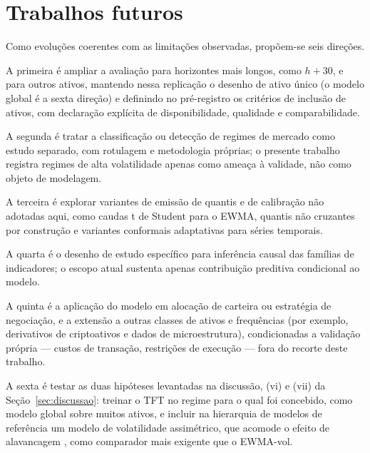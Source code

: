 \section{Trabalhos futuros}
Como evoluções coerentes com as limitações observadas, propõem-se seis direções.

A primeira é ampliar a avaliação para horizontes mais longos, como \(h+30\), e para outros ativos, mantendo nessa replicação o desenho de ativo único (o modelo global é a sexta direção) e definindo no pré-registro os critérios de inclusão de ativos, com declaração explícita de disponibilidade, qualidade e comparabilidade.

A segunda é tratar a classificação ou detecção de regimes de mercado como estudo separado, com rotulagem e metodologia próprias; o presente trabalho registra regimes de alta volatilidade apenas como ameaça à validade, não como objeto de modelagem.

A terceira é explorar variantes de emissão de quantis e de calibração não adotadas aqui, como caudas t de Student para o EWMA, quantis não cruzantes por construção \cite{BONDELL2010,CANNON2018} e variantes conformais adaptativas para séries temporais.

A quarta é o desenho de estudo específico para inferência causal das famílias de indicadores; o escopo atual sustenta apenas contribuição preditiva condicional ao modelo.

A quinta é a aplicação do modelo em alocação de carteira ou estratégia de negociação, e a extensão a outras classes de ativos e frequências (por exemplo, derivativos de criptoativos e dados de microestrutura), condicionadas a validação própria --- custos de transação, restrições de execução --- fora do recorte deste trabalho.

A sexta é testar as duas hipóteses levantadas na discussão, (vi) e (vii) da Seção~\ref{sec:discussao}: treinar o TFT no regime para o qual foi concebido, como modelo global sobre muitos ativos, e incluir na hierarquia de modelos de referência um modelo de volatilidade assimétrico, que acomode o efeito de alavancagem \cite{HANSEN2005}, como comparador mais exigente que o EWMA-vol.
